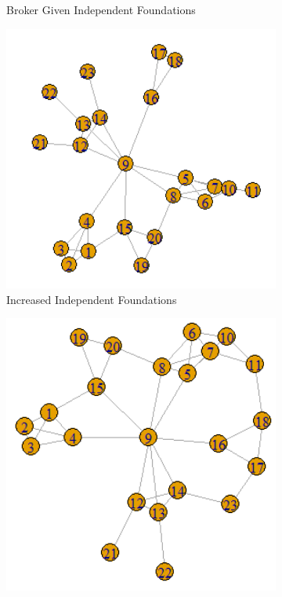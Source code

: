 \documentclass[12pt]{article}
\begin{document}
\begin{figure}
\begin{subfigure}[b]{0.45\textwidth}
            \caption{Broker Given Independent Foundations}
            \label{fig:Placehold}
    \end{subfigure}
         \begin{subfigure}[b]{0.45\textwidth}
        \includegraphics[width=1.0\textwidth]{Plots/political3.png}
            \caption{Increased Independent Foundations}
            \label{fig:Placehold}
    \end{subfigure}
     \begin{subfigure}[b]{0.45\textwidth}
        \includegraphics[width=1.0\textwidth]{Plots/political4.png}

\end{subfigure}
\end{figure}
\end{document}
